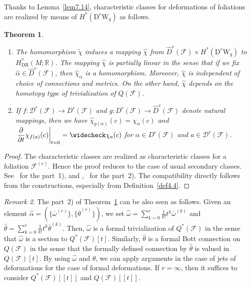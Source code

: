 \documentclass[12pt]{amsart}
\newcommand{\CF}{{\mathcal F}}
\newcommand{\R}{{\mathbb R}}
\newcommand{\W}{\mathrm{W}}
\newcommand{\D}{\mathrm{D}}
\newcommand{\pdif}[2]{\dfrac{\partial#1}{\partial#2}}
\newtheorem{theorem}{Theorem}[section]
\theoremstyle{definition}
\theoremstyle{remark}
\newtheorem{remark}[theorem]{Remark}
\begin{document}
Thanks to Lemma~\ref{lem7.14}, characteristic classes for deformations of foliations are realized by means of $H^*(\D^r\W_q)$ as follows.

\begin{theorem}
\label{thm6.6}
\begin{enumerate}
\item[\textup{1)}]
The homomorphism $\widetilde\chi$ induces a mapping $\widehat\chi$ from $\widehat{D}^r(\CF)\times H^*(\D^r\W_q)$ to $H_{\mathrm{DR}}^*(M;\R)$.
The mapping $\widehat\chi$ is partially linear in the sense that if we fix $\widehat\alpha\in\widehat{D}^r(\CF)$, then $\widehat\chi_\alpha$ is a homomorphism.
Moreover, $\widehat\chi$ is independent of choice of connections and metrics.
On the other hand, $\widehat\chi$ depends on the homotopy type of trivialization of $Q(\CF)$.
\item[\textup{2)}]
If $f\colon\mathscr{D}^r(\CF)\to D^r(\CF)$ and $g\colon D^r(\CF)\to\widehat{D}^r(\CF)$ denote natural mappings, then we have $\widehat\chi_{g(\alpha)}(c)=\chi_{\alpha}(c)$ and $\left.\pdif{}{t}\chi_{f(a)}(c)\right|_{t=0}=\widecheck\chi_{a}(c)$ for $\alpha\in D^r(\CF)$ and $a\in\mathscr{D}^r(\CF)$.
\end{enumerate}
\end{theorem}
\begin{proof}
The characteristic classes are realized as characteristic classes for a foliation $\CF^{(r)}$.
Hence the proof reduces to the case of usual secondary classes.
See~\cite{Bott:LNM} for the part~1), and \cite{13},~\cite{asuke:GV} for the part~2).
The compatibility directly follows from the constructions, especially from Definition~\ref{def4.4}.
\end{proof}

\begin{remark}
The part~2) of Theorem~\ref{thm6.6} can be also seen as follows.
Given an element $\widehat\alpha=(\{{\overline\omega}^{(r)}\},\{{\overline\theta}^{(r)}\})$, we set $\widehat\omega=\sum_{k=0}^r\frac1{k!}t^k\overline\omega^{(k)}$ and $\widehat\theta=\sum_{k=0}^r\frac1{k!}t^k\overline\theta^{(k)}$.
Then, $\widehat\omega$ is a formal trivialization of $Q^*(\CF)$ in the sense that $\widehat\omega$ is a section to $Q^*(\CF)[t]$.
Similarly, $\widehat\theta$ is a formal Bott connection on $Q(\CF)$ in the sense that the formally defined connection by $\widehat\theta$ is valued in $Q(\CF)[t]$.
By using $\widehat\omega$ and $\widehat\theta$, we can apply arguments in the case of jets of deformations for the case of formal deformations.
If $r=\infty$, then it suffices to consider $Q^*(\CF)[[t]]$ and $Q(\CF)[[t]]$.
\end{remark}
\end{document}
